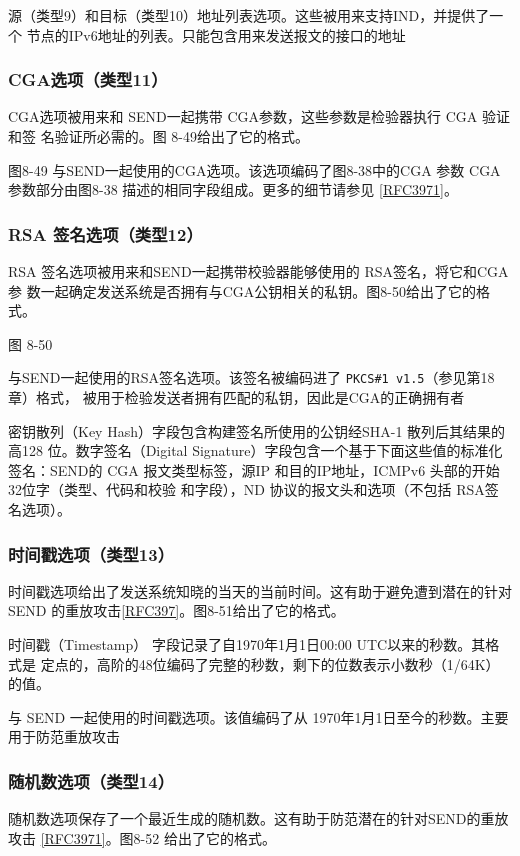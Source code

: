 源（类型9）和目标（类型10）地址列表选项。这些被用来支持IND，并提供了一个
节点的IPv6地址的列表。只能包含用来发送报文的接口的地址

\subsubsection{CGA选项（类型11）}
CGA选项被用来和 SEND一起携带 CGA参数，这些参数是检验器执行 CGA 验证和签
名验证所必需的。图 8-49给出了它的格式。

图8-49 与SEND一起使用的CGA选项。该选项编码了图8-38中的CGA 参数
CGA 参数部分由图8-38 描述的相同字段组成。更多的细节请参见 \href{https://www.rfc-editor.org/rfc/rfc3971}{[RFC3971]}。

\subsubsection{RSA 签名选项（类型12）}
RSA 签名选项被用来和SEND一起携带校验器能够使用的 RSA签名，将它和CGA参
数一起确定发送系统是否拥有与CGA公钥相关的私钥。图8-50给出了它的格式。


图 8-50

与SEND一起使用的RSA签名选项。该签名被编码进了 \verb|PKCS#1 v1.5|（参见第18章）格式，
被用于检验发送者拥有匹配的私钥，因此是CGA的正确拥有者

密钥散列（Key Hash）字段包含构建签名所使用的公钥经SHA-1 散列后其结果的高128
位。数字签名（Digital Signature）字段包含一个基于下面这些值的标准化签名：SEND的
CGA 报文类型标签，源IP 和目的IP地址，ICMPv6 头部的开始32位字（类型、代码和校验
和字段），ND 协议的报文头和选项（不包括 RSA签名选项）。

\subsubsection{时间戳选项（类型13）}
时间戳选项给出了发送系统知晓的当天的当前时间。这有助于避免遭到潜在的针对
SEND 的重放攻击\href{https://www.rfc-editor.org/rfc/rfc397}{[RFC397]}。图8-51给出了它的格式。

时间戳（Timestamp） 字段记录了自1970年1月1日00:00 UTC以来的秒数。其格式是
定点的，高阶的48位编码了完整的秒数，剩下的位数表示小数秒（1/64K）的值。

与 SEND 一起使用的时间戳选项。该值编码了从 1970年1月1日至今的秒数。主要用于防范重放攻击

\subsubsection{随机数选项（类型14）}
随机数选项保存了一个最近生成的随机数。这有助于防范潜在的针对SEND的重放攻击
\href{https://www.rfc-editor.org/rfc/rfc3971}{[RFC3971]}。图8-52 给出了它的格式。

